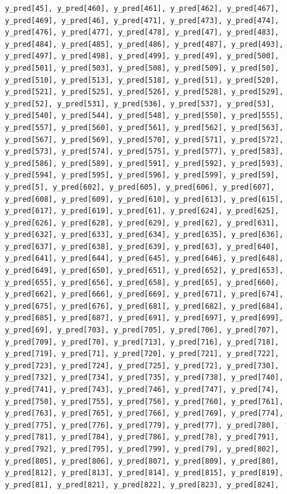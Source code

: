\documentclass[
  letterpaper,
  DIV=11,
  numbers=noendperiod]{scrartcl}
\begin{document}
\begin{verbatim}
y_pred[45], y_pred[460], y_pred[461], y_pred[462], y_pred[467],
y_pred[469], y_pred[46], y_pred[471], y_pred[473], y_pred[474],
y_pred[476], y_pred[477], y_pred[478], y_pred[47], y_pred[483],
y_pred[484], y_pred[485], y_pred[486], y_pred[487], y_pred[493],
y_pred[497], y_pred[498], y_pred[499], y_pred[49], y_pred[500],
y_pred[501], y_pred[503], y_pred[508], y_pred[509], y_pred[50],
y_pred[510], y_pred[513], y_pred[518], y_pred[51], y_pred[520],
y_pred[521], y_pred[525], y_pred[526], y_pred[528], y_pred[529],
y_pred[52], y_pred[531], y_pred[536], y_pred[537], y_pred[53],
y_pred[540], y_pred[544], y_pred[548], y_pred[550], y_pred[555],
y_pred[557], y_pred[560], y_pred[561], y_pred[562], y_pred[563],
y_pred[567], y_pred[569], y_pred[570], y_pred[571], y_pred[572],
y_pred[573], y_pred[574], y_pred[575], y_pred[577], y_pred[583],
y_pred[586], y_pred[589], y_pred[591], y_pred[592], y_pred[593],
y_pred[594], y_pred[595], y_pred[596], y_pred[599], y_pred[59],
y_pred[5], y_pred[602], y_pred[605], y_pred[606], y_pred[607],
y_pred[608], y_pred[609], y_pred[610], y_pred[613], y_pred[615],
y_pred[617], y_pred[619], y_pred[61], y_pred[624], y_pred[625],
y_pred[626], y_pred[628], y_pred[629], y_pred[62], y_pred[631],
y_pred[632], y_pred[633], y_pred[634], y_pred[635], y_pred[636],
y_pred[637], y_pred[638], y_pred[639], y_pred[63], y_pred[640],
y_pred[641], y_pred[644], y_pred[645], y_pred[646], y_pred[648],
y_pred[649], y_pred[650], y_pred[651], y_pred[652], y_pred[653],
y_pred[655], y_pred[656], y_pred[658], y_pred[65], y_pred[660],
y_pred[662], y_pred[666], y_pred[669], y_pred[671], y_pred[674],
y_pred[675], y_pred[676], y_pred[681], y_pred[682], y_pred[684],
y_pred[685], y_pred[687], y_pred[691], y_pred[697], y_pred[699],
y_pred[69], y_pred[703], y_pred[705], y_pred[706], y_pred[707],
y_pred[709], y_pred[70], y_pred[713], y_pred[716], y_pred[718],
y_pred[719], y_pred[71], y_pred[720], y_pred[721], y_pred[722],
y_pred[723], y_pred[724], y_pred[725], y_pred[72], y_pred[730],
y_pred[732], y_pred[734], y_pred[735], y_pred[738], y_pred[740],
y_pred[741], y_pred[743], y_pred[746], y_pred[747], y_pred[74],
y_pred[750], y_pred[755], y_pred[756], y_pred[760], y_pred[761],
y_pred[763], y_pred[765], y_pred[766], y_pred[769], y_pred[774],
y_pred[775], y_pred[776], y_pred[779], y_pred[77], y_pred[780],
y_pred[781], y_pred[784], y_pred[786], y_pred[78], y_pred[791],
y_pred[792], y_pred[795], y_pred[799], y_pred[79], y_pred[802],
y_pred[805], y_pred[806], y_pred[807], y_pred[809], y_pred[80],
y_pred[812], y_pred[813], y_pred[814], y_pred[815], y_pred[819],
y_pred[81], y_pred[821], y_pred[822], y_pred[823], y_pred[824],

\end{verbatim}
\end{document}
